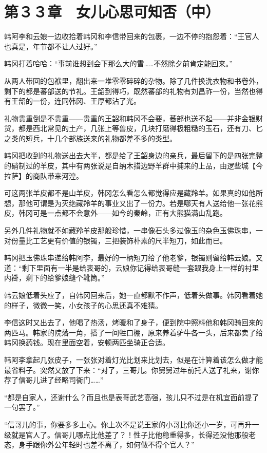 \section{第３３章　女儿心思可知否（中）}

韩阿李和云娘一边收拾着韩冈和李信带回来的包裹，一边不停的抱怨着：“王官人也真是，年节都不让人过好。”

韩冈打着哈哈：“事前谁想到会下那么大的雪……不然除夕前肯定能回来。”

从两人带回的包袱里，翻出来一堆零零碎碎的杂物。除了几件换洗衣物和书卷外，剩下的都是蕃部送的节礼。王韶到得巧，既然蕃部的礼物有刘昌祚一份，当然也得有王韶的一份，连同韩冈、王厚都沾了光。

礼物贵重倒是不贵重——贵重的王韶和韩冈不会要，蕃部也送不起——并非金银财货，都是西北常见的土产，几张上等兽皮，几块打磨得极粗糙的玉石，还有刀、匕之类的短兵，十几个部族送来的礼物都差不多的类型。

韩冈把收到的礼物送出去大半，都是给了王韶身边的亲兵，最后留下的是四张完整的硝制过的羊皮，其中有两张说是自纳木措边野羊群中捕来的上品，由逻些城【今拉萨】的商队带来河湟。

可这两张羊皮都不是山羊皮，韩冈怎么看怎么都觉得应是藏羚羊。如果真的如他所想，那他可谓是为灭绝藏羚羊的事业又出了一份力。若是哪天有人送给他一张花熊皮，韩冈可是一点都不会意外——如今的秦岭，正有大熊猫满山乱跑。

另外几件礼物就不如藏羚羊皮那般珍惜，一串像石头多过像玉的杂色玉佛珠串，一对份量比工艺更有价值的银镯，三把装饰朴素的尺半短刀，如此而已。

韩冈把玉佛珠串递给韩阿李，最好的一柄短刀给了他老爹，银镯则留给韩云娘。又道：“剩下里面有一半是给表哥的，云娘你记得给表哥缝一套跟我身上一样的衬里内褂，剩下的给爹娘缝个靴筒。”

韩云娘低着头应了，自韩冈回来后，她一直都默不作声，低着头做事。韩冈看着她的样子，微微一笑，小女孩子的心思还真不难猜。

李信这时又出去了，他喝了热汤，烤暖和了身子，便到院中照料他和韩冈骑回来的两匹马。韩家的院落一角，搭了一间牲口棚，原来养着驴牛各一头，后来都卖了给韩冈换药钱。现在里面空着，安顿两匹坐骑正合适。

韩阿李拿起几张皮子，一张张对着灯光比划来比划去，似是在计算着该怎么做才能最省料子。突然又放了下来：“对了，三哥儿。你舅舅过年前托人送了礼来，谢你荐了信哥儿进了经略司衙门……”

“都是自家人，还谢什么？而且也是表哥武艺高强，孩儿只不过是在机宜面前提了一句罢了。”

“信哥儿的事，你要多多上心。你上次不是说王家的小哥比你还小一岁，可再升一级就是官人了。信哥儿哪点比他差了？！性子比他稳重得多，长得还没他那般老态，身手跟你外公年轻时也差不离了，如何做不得个官人？”

